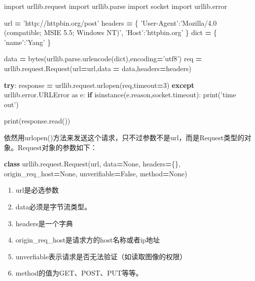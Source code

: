 \documentclass[]{ctexbook}
\newenvironment{Shaded}{\begin{snugshade}}{\end{snugshade}}
\newcommand{\BuiltInTok}[1]{#1}
\newcommand{\ControlFlowTok}[1]{\textcolor[rgb]{0.13,0.29,0.53}{\textbf{#1}}}
\newcommand{\DecValTok}[1]{\textcolor[rgb]{0.00,0.00,0.81}{#1}}
\newcommand{\ImportTok}[1]{#1}
\newcommand{\KeywordTok}[1]{\textcolor[rgb]{0.13,0.29,0.53}{\textbf{#1}}}
\newcommand{\NormalTok}[1]{#1}
\newcommand{\OperatorTok}[1]{\textcolor[rgb]{0.81,0.36,0.00}{\textbf{#1}}}
\newcommand{\StringTok}[1]{\textcolor[rgb]{0.31,0.60,0.02}{#1}}
\newcommand{\VariableTok}[1]{\textcolor[rgb]{0.00,0.00,0.00}{#1}}
\providecommand{\tightlist}{%
  \setlength{\itemsep}{0pt}\setlength{\parskip}{0pt}}
\begin{document}
\begin{Shaded}
\begin{Highlighting}[]
\ImportTok{import}\NormalTok{ urllib.request}
\ImportTok{import}\NormalTok{ urllib.parse}
\ImportTok{import}\NormalTok{ socket}
\ImportTok{import}\NormalTok{ urllib.error}

\NormalTok{url }\OperatorTok{=} \StringTok{'http://httpbin.org/post'}
\NormalTok{headers }\OperatorTok{=}\NormalTok{ \{}
    \StringTok{'User-Agent'}\NormalTok{:}\StringTok{'Mozilla/4.0 (compatible; MSIE 5.5; Windows NT)'}\NormalTok{,}
    \StringTok{'Host'}\NormalTok{:}\StringTok{'httpbin.org'}
\NormalTok{\}}
\BuiltInTok{dict} \OperatorTok{=}\NormalTok{ \{}
    \StringTok{'name'}\NormalTok{:}\StringTok{'Yang'}
\NormalTok{\}}

\NormalTok{data }\OperatorTok{=} \BuiltInTok{bytes}\NormalTok{(urllib.parse.urlencode(}\BuiltInTok{dict}\NormalTok{),encoding}\OperatorTok{=}\StringTok{'utf8'}\NormalTok{)}
\NormalTok{req }\OperatorTok{=}\NormalTok{ urllib.request.Request(url}\OperatorTok{=}\NormalTok{url,data }\OperatorTok{=}\NormalTok{ data,headers}\OperatorTok{=}\NormalTok{headers)}

\ControlFlowTok{try}\NormalTok{:}
\NormalTok{   response }\OperatorTok{=}\NormalTok{ urllib.request.urlopen(req,timeout}\OperatorTok{=}\DecValTok{3}\NormalTok{)}
\ControlFlowTok{except}\NormalTok{ urllib.error.URLError }\ImportTok{as}\NormalTok{ e:}
    \ControlFlowTok{if} \BuiltInTok{isinstance}\NormalTok{(e.reason,socket.timeout):}
        \BuiltInTok{print}\NormalTok{(}\StringTok{'time out'}\NormalTok{)}

\BuiltInTok{print}\NormalTok{(response.read())}
\end{Highlighting}
\end{Shaded}

依然用urlopen()方法来发送这个请求，只不过参数不是url，而是Request类型的对象。Request对象的参数如下：

\begin{Shaded}
\begin{Highlighting}[]
\KeywordTok{class}\NormalTok{ urllib.request.Request(url, data}\OperatorTok{=}\VariableTok{None}\NormalTok{, headers}\OperatorTok{=}\NormalTok{\{\}, origin_req_host}\OperatorTok{=}\VariableTok{None}\NormalTok{, unverifiable}\OperatorTok{=}\VariableTok{False}\NormalTok{, method}\OperatorTok{=}\VariableTok{None}\NormalTok{)}
\end{Highlighting}
\end{Shaded}

\begin{enumerate}
\def\labelenumi{\arabic{enumi}.}
\tightlist
\item
  url是必选参数
\item
  data必须是字节流类型。
\item
  headers是一个字典
\item
  origin\_req\_host是请求方的host名称或者ip地址
\item
  unverfiable表示请求是否无法验证（如读取图像的权限）
\item
  method的值为GET、POST、PUT等等。
\end{enumerate}
\end{document}

